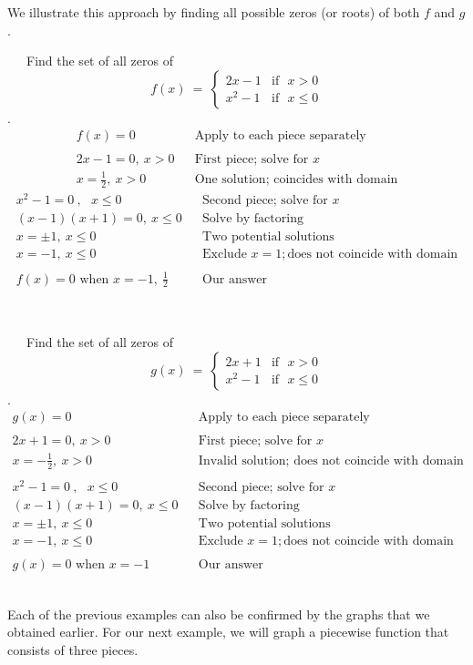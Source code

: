 We illustrate this approach by finding all possible zeros (or roots) of both $f$ and $g$.
\begin{example}~~~Find the set of all zeros of \[ f(x)~=~
	\begin{cases} 
      2x-1 & \text{if~~} x> 0\\
			x^2-1 & \text{if~~} x\leq 0
  \end{cases}
\].
\begin{eqnarray*}
	f(x)=0~~~~~ & &\text{Apply~to~each~piece~separately}\\
	& &\\
	2x-1=0,~x>0 & &\text{First~piece;~solve~for~}x\\
	x=\frac{1}{2},~x>0 & & \text{One~solution;~coincides~with~domain}
\end{eqnarray*}
\begin{eqnarray*}
	x^2-1=0~,~~~x\leq 0 & &\text{Second~piece;~solve~for~}x\\
	(x-1)(x+1)=0,~x\leq 0 & & \text{Solve~by~factoring}\\
	x=\pm 1,~x\leq 0 & & \text{Two~potential~solutions}\\
	x=-1,~x\leq 0 & &\text{Exclude~} x=1; \text{does~not~coincide~with~domain}\\
	& &\\
	f(x)=0 \text{~when~} x=-1,~ \frac{1}{2} & & \text{Our~answer}
\end{eqnarray*}
\end{example} 
~\\
\begin{example}~~~Find the set of all zeros of \[ g(x)~=~
\begin{cases} 
      2x+1 & \text{if~~} x> 0\\
			x^2-1 & \text{if~~} x\leq 0
  \end{cases}
\].
\begin{eqnarray*}
	g(x)=0~~~~~ & &\text{Apply~to~each~piece~separately}\\
	& &\\
	2x+1=0,~x>0 & &\text{First~piece;~solve~for~}x\\
	x=-\frac{1}{2},~x>0 & & \text{Invalid~solution;~does~not~coincide~with~domain}\\
	& &\\
	x^2-1=0~,~~~x\leq 0 & &\text{Second~piece;~solve~for~}x\\
	(x-1)(x+1)=0,~x\leq 0 & & \text{Solve~by~factoring}\\
	x=\pm 1,~x\leq 0 & & \text{Two~potential~solutions}\\
	x=-1,~x\leq 0 & &\text{Exclude~} x=1; \text{does~not~coincide~with~domain}\\
	& &\\
	g(x)=0 \text{~when~} x=-1 & & \text{Our~answer}
\end{eqnarray*}
\end{example}
~\\
Each of the previous examples can also be confirmed by the graphs that we obtained earlier.\pp
For our next example, we will graph a piecewise function that consists of three pieces.
\newpage

